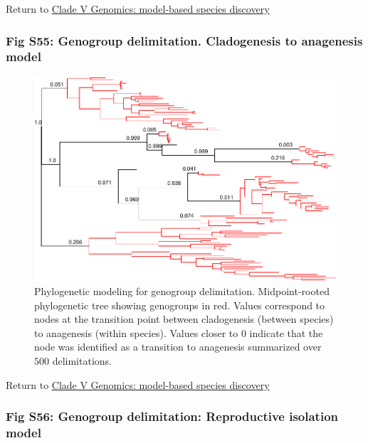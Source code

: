 \documentclass[
  11pt,
]{article}
\begin{document}
Return to \protect\hyperlink{model-based-species-discovery-9}{Clade V Genomics: model-based species discovery}
\pagebreak

\hypertarget{fig-s55-genogroup-delimitation.-cladogenesis-to-anagenesis-model}{%
\subsubsection{Fig S55: Genogroup delimitation. Cladogenesis to anagenesis model}\label{fig-s55-genogroup-delimitation.-cladogenesis-to-anagenesis-model}}

\begin{figure}
\includegraphics[height=.6\textwidth,]{Supplementary_Material_files/figure-latex/cladeVmolecularDelimitationsPhylogeny2-1} \caption{Phylogenetic modeling for genogroup delimitation. Midpoint-rooted phylogenetic tree showing genogroups in red. Values correspond to nodes at the transition point between cladogenesis (between species) to anagenesis (within species). Values closer to 0 indicate that the node was identified as a transition to anagenesis summarized over $500$ delimitations.}\label{fig:cladeVmolecularDelimitationsPhylogeny2}
\end{figure}

Return to \protect\hyperlink{model-based-species-discovery-9}{Clade V Genomics: model-based species discovery}
\pagebreak

\hypertarget{fig-s56-genogroup-delimitation-reproductive-isolation-model}{%
\subsubsection{Fig S56: Genogroup delimitation: Reproductive isolation model}\label{fig-s56-genogroup-delimitation-reproductive-isolation-model}}
\end{document}

